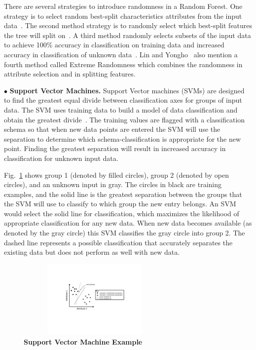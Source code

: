 \documentclass[conference]{IEEEtran}
\begin{document}
There are several strategies to introduce randomness in a Random Forest. One strategy is to select random best-split characteristics attributes from the input data~\cite{Breiman:01}. The second method strategy is to randomly select which best-split features the tree will split on~\cite{Dietterich:2000}. A third method randomly selects subsets of the input data to achieve 100\% accuracy in classification on training data and increased accuracy in classification of unknown data~\cite{Ho:98}.
Lin and Yongho~\cite{Lin:06} also mention a fourth method called Extreme Randomness which combines the randomness in attribute selection and in splitting features.

$\bullet$ {\bf Support Vector Machines.}
Support Vector machines (SVMs) are designed to find the greatest equal divide between classification axes for groups of input data. The SVM uses training data to build a model of data classification and obtain the greatest divide~\cite{Hoffert:10}. The training values are flagged with a classification schema so that when new data points are entered the SVM will use the separation to determine which schema-classification is appropriate for the new point. Finding the greatest separation will result in increased accuracy in classification for unknown input data.

	Fig.~\ref{Fig:SVM} shows group 1 (denoted by filled circles), group 2 (denoted by open circles), and an unknown input in gray. The circles in black are training examples, and the solid line is the greatest separation between the groups that the SVM will use to classify to which group the new entry belongs. An SVM would select the solid line for classification, which maximizes the likelihood of appropriate classification for any new data.
When new data becomes available (as denoted by the gray circle) this SVM
classifies the gray circle into group 2.
The dashed line represents a possible classification that accurately separates the existing data
but does not perform as well with new data.

\begin{figure}[t]
	\centering
	\includegraphics[height=1.5in, width=3in]{SVM.pdf}
	\caption{\bf Support Vector Machine Example}
	\label{Fig:SVM}
	\vspace{-0.25in}
\end{figure}
\end{document}
